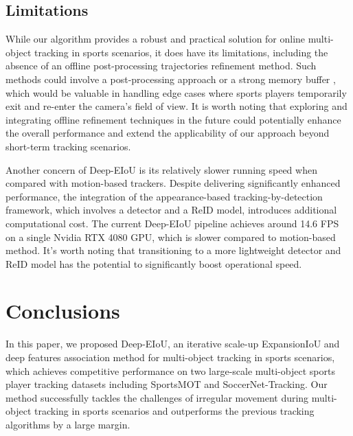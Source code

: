 \documentclass[10pt,twocolumn,letterpaper]{article}
\begin{document}
\subsection{Limitations}
While our algorithm provides a robust and practical solution for online multi-object tracking in sports scenarios, it does have its limitations, including the absence of an offline post-processing trajectories refinement method. Such methods could involve a post-processing approach \cite{huang2023observation} or a strong memory buffer \cite{wang2022sportstrack}, which would be valuable in handling edge cases where sports players temporarily exit and re-enter the camera's field of view. It is worth noting that exploring and integrating offline refinement techniques in the future could potentially enhance the overall performance and extend the applicability of our approach beyond short-term tracking scenarios.

Another concern of Deep-EIoU is its relatively slower running speed when compared with motion-based trackers. Despite delivering significantly enhanced performance, the integration of the appearance-based tracking-by-detection framework, which involves a detector and a ReID model, introduces additional computational cost. The current Deep-EIoU pipeline achieves around 14.6 FPS on a single Nvidia RTX 4080 GPU, which is slower compared to motion-based method. It's worth noting that transitioning to a more lightweight detector and ReID model has the potential to significantly boost operational speed.

\section{Conclusions}
In this paper, we proposed Deep-EIoU, an iterative scale-up ExpansionIoU and deep features association method for multi-object tracking in sports scenarios, which achieves competitive performance on two large-scale multi-object sports player tracking datasets including SportsMOT and SoccerNet-Tracking. Our method successfully tackles the challenges of irregular movement during multi-object tracking in sports scenarios and outperforms the previous tracking algorithms by a large margin.\\

{\small


}
\end{document}
